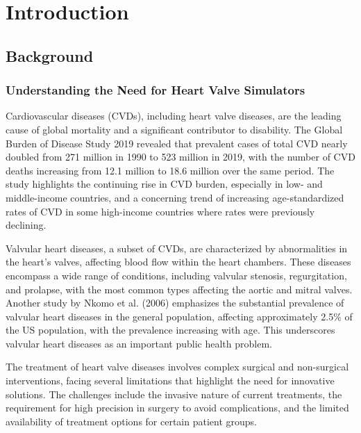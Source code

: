 \chapter{Introduction}\label{chap:intro}

\section{Background}

\subsection{Understanding the Need for Heart Valve Simulators}

Cardiovascular diseases (CVDs), including heart valve diseases, are the leading cause of global mortality and a significant contributor to disability. The Global Burden of Disease Study 2019 revealed that prevalent cases of total CVD nearly doubled from 271 million in 1990 to 523 million in 2019, with the number of CVD deaths increasing from 12.1 million to 18.6 million over the same period. The study highlights the continuing rise in CVD burden, especially in low- and middle-income countries, and a concerning trend of increasing age-standardized rates of CVD in some high-income countries where rates were previously declining.\cite{rothGlobalBurdenCardiovascular2020a}

Valvular heart diseases, a subset of CVDs, are characterized by abnormalities in the heart's valves, affecting blood flow within the heart chambers. These diseases encompass a wide range of conditions, including valvular stenosis, regurgitation, and prolapse, with the most common types affecting the aortic and mitral valves.
Another study by Nkomo et al. (2006) emphasizes the substantial prevalence of valvular heart diseases in the general population, affecting approximately 2.5\% of the US population, with the prevalence increasing with age. This underscores valvular heart diseases as an important public health problem. \cite{nkomoBurdenValvularHeart2006a}

The treatment of heart valve diseases involves complex surgical and non-surgical interventions, facing several limitations that highlight the need for innovative solutions. The challenges include the invasive nature of current treatments, the requirement for high precision in surgery to avoid complications, and the limited availability of treatment options for certain patient groups. \cite{musumeciProstheticAorticValves2018}

